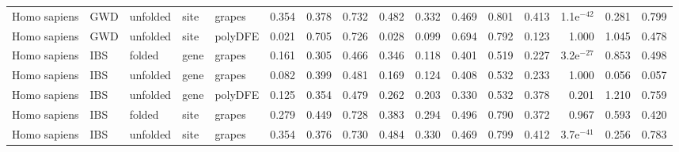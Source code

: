 \begin{longtable}{lllllrrrrrrrrrrr}
        Homo sapiens &                       GWD &  unfolded &  site &   grapes &                              0.354 &                               0.378 &                 0.732 &                 0.482 &                              0.332 &                               0.469 &                 0.801 &                 0.413 &  1.1e$^{-42}$ &  0.281 &  0.799 \\
        Homo sapiens &                       GWD &  unfolded &  site &  polyDFE &                              0.021 &                               0.705 &                 0.726 &                 0.028 &                              0.099 &                               0.694 &                 0.792 &                 0.123 &         1.000 &  1.045 &  0.478 \\
        Homo sapiens &                       IBS &    folded &  gene &   grapes &                              0.161 &                               0.305 &                 0.466 &                 0.346 &                              0.118 &                               0.401 &                 0.519 &                 0.227 &  3.2e$^{-27}$ &  0.853 &  0.498 \\
        Homo sapiens &                       IBS &  unfolded &  gene &   grapes &                              0.082 &                               0.399 &                 0.481 &                 0.169 &                              0.124 &                               0.408 &                 0.532 &                 0.233 &         1.000 &  0.056 &  0.057 \\
        Homo sapiens &                       IBS &  unfolded &  gene &  polyDFE &                              0.125 &                               0.354 &                 0.479 &                 0.262 &                              0.203 &                               0.330 &                 0.532 &                 0.378 &         0.201 &  1.210 &  0.759 \\
        Homo sapiens &                       IBS &    folded &  site &   grapes &                              0.279 &                               0.449 &                 0.728 &                 0.383 &                              0.294 &                               0.496 &                 0.790 &                 0.372 &         0.967 &  0.593 &  0.420 \\
        Homo sapiens &                       IBS &  unfolded &  site &   grapes &                              0.354 &                               0.376 &                 0.730 &                 0.484 &                              0.330 &                               0.469 &                 0.799 &                 0.412 &  3.7e$^{-41}$ &  0.256 &  0.783 \\

\end{longtable}
